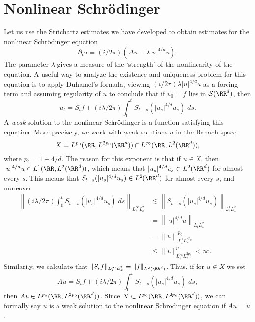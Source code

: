 \section{Nonlinear Schr\"{o}dinger}

Let us use the Strichartz estimates we have developed to obtain estimates for the nonlinear Schr\"{o}dinger equation
%
\[ \partial_t u = (i/2\pi)(\Delta u + \lambda |u|^{4/d} u). \]
%
The parameter $\lambda$ gives a measure of the `strength' of the nonlinearity of the equation. A useful way to analyze the existence and uniqueness problem for this equation is to apply Duhamel's formula, viewing $(i/2\pi) \lambda |u|^{4/d} u$ as a forcing term and assuming regularity of $u$ to conclude that if $u_0 = f$ lies in $\mathcal{S}(\RR^d)$, then
%
\[ u_t = S_t f + (i\lambda/2\pi) \int_0^t S_{t-s}(|u_s|^{4/d} u_s)\; ds. \]
%
A \emph{weak} solution to the nonlinear Schr\"{o}dinger is a function satisfying this equation. More precisely, we work with weak solutions $u$ in the Banach space
%
\[ X = L^{p_0}(\RR, L^{2p_0}(\RR^d)) \cap L^\infty(\RR, L^2(\RR^d)), \]
%
where $p_0 = 1 + 4/d$. The reason for this exponent is that if $u \in X$, then $|u|^{4/d} u \in L^1(\RR,L^2(\RR^d))$, which means that $|u_s|^{4/d} u_s \in L^2(\RR^d)$ for almost every $s$. This means that $S_{t-s}(|u_s|^{4/d} u_s) \in L^2(\RR^d)$ for almost every $s$, and moreover
%
\begin{align*}
    \left\| (i\lambda/2\pi) \int_0^t S_{t-s}(|u_s|^{4/d} u_s)\; ds \right\|_{L^\infty_t L^2_x} &\lesssim \left\| S_{t-s}(|u_s|^{4/d} u_s) \right\|_{L^1_t L^2_x}\\
    &= \left\| |u|^{4/d} u \right\|_{L^1_t L^2_x}\\
    &= \left\| u \right\|_{L^1_t L^{2p_0}_x}^{p_0}\\
    &\leq \| u \|_{L^{p_0}_t L^{2p_0}_x}^{p_0} < \infty.
\end{align*}
%
Similarily, we calculate that $\| S_t f \|_{L^\infty_t L^2_x} = \| f \|_{L^2(\RR^d)}$. Thus, if for $u \in X$ we set
%
\[ Au = S_t f + (i\lambda/2\pi) \int_0^t S_{t-s}(|u_s|^{4/d} u_s)\; ds, \]
%
then $Au \in L^{p_0}(\RR,L^{2p_0}(\RR^d))$. Since $X \subset L^{p_0}(\RR,L^{2p_0}(\RR^d))$, we can formally say $u$ is a weak solution to the nonlinear Schr\"{o}dinger equation if $Au = u$.


